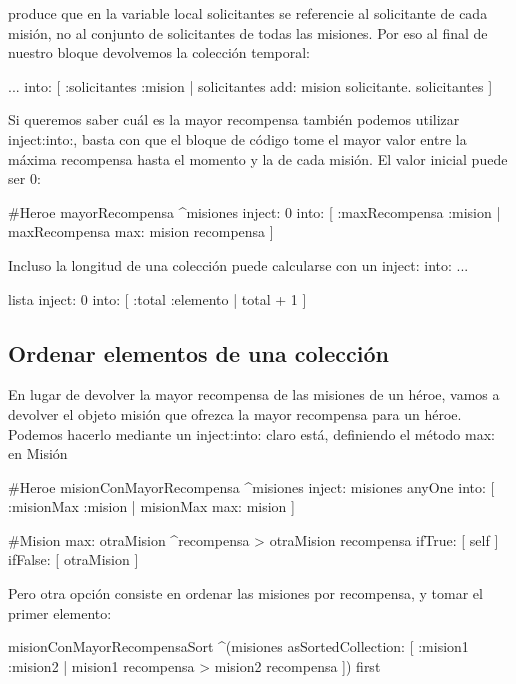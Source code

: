 \documentclass[a4paper,12pt]{book}
\begin{document}
produce que en la variable local solicitantes se referencie al solicitante de cada misión, no al conjunto de
solicitantes de todas las misiones. Por eso al final de nuestro bloque devolvemos la colección temporal:

\begin{code}
          ... into: [ :solicitantes :mision | 
	             solicitantes add: mision solicitante. 
	             solicitantes  ] 
\end{code}

Si queremos saber cuál es la mayor recompensa también podemos utilizar inject:into:, basta
con que el bloque de código tome el mayor valor entre la máxima recompensa hasta el momento y
la de cada misión. El valor inicial puede ser 0:

\begin{code}
#Heroe
mayorRecompensa
   ^misiones inject: 0
             into: [ :maxRecompensa :mision | maxRecompensa max: mision recompensa ] 
\end{code}

Incluso la longitud de una colección puede calcularse con un inject: into: ...

\begin{code}
lista inject: 0
      into: [ :total :elemento | total + 1 ] 
\end{code}


\subsection{Ordenar elementos de una colección}
En lugar de devolver la mayor recompensa de las misiones de un héroe, vamos a devolver el objeto misión que
ofrezca la mayor recompensa para un héroe. Podemos hacerlo mediante un inject:into: claro está, definiendo el
método max: en Misión

\begin{code}
#Heroe
misionConMayorRecompensa
   ^misiones inject: misiones anyOne
             into: [ :misionMax :mision | misionMax max: mision ] 
             
#Mision
max: otraMision
    ^recompensa > otraMision recompensa
          ifTrue: [ self ]
          ifFalse: [ otraMision ]
\end{code}

Pero otra opción consiste en ordenar las misiones por recompensa, y tomar el primer elemento:

\begin{code}
misionConMayorRecompensaSort
   ^(misiones asSortedCollection: [ :mision1 :mision2 | mision1 recompensa > mision2 recompensa ])
       first
\end{code}
\end{document}
